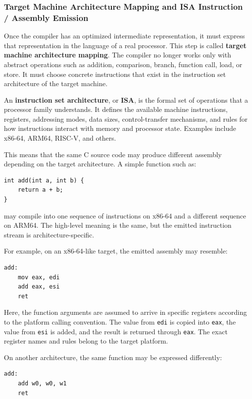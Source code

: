 \subsubsection{Target Machine Architecture Mapping and ISA Instruction / Assembly Emission}

Once the compiler has an optimized intermediate representation, it must express that representation in the language of a real processor. This step is called \textbf{target machine architecture mapping}. The compiler no longer works only with abstract operations such as addition, comparison, branch, function call, load, or store. It must choose concrete instructions that exist in the instruction set architecture of the target machine.

An \textbf{instruction set architecture}, or \textbf{ISA}, is the formal set of operations that a processor family understands. It defines the available machine instructions, registers, addressing modes, data sizes, control-transfer mechanisms, and rules for how instructions interact with memory and processor state. Examples include x86-64, ARM64, RISC-V, and others.

This means that the same C source code may produce different assembly depending on the target architecture. A simple function such as:

\begin{verbatim}
int add(int a, int b) {
    return a + b;
}
\end{verbatim}

may compile into one sequence of instructions on x86-64 and a different sequence on ARM64. The high-level meaning is the same, but the emitted instruction stream is architecture-specific.

For example, on an x86-64-like target, the emitted assembly may resemble:

\begin{verbatim}
add:
    mov eax, edi
    add eax, esi
    ret
\end{verbatim}

Here, the function arguments are assumed to arrive in specific registers according to the platform calling convention. The value from \texttt{edi} is copied into \texttt{eax}, the value from \texttt{esi} is added, and the result is returned through \texttt{eax}. The exact register names and rules belong to the target platform.

On another architecture, the same function may be expressed differently:

\begin{verbatim}
add:
    add w0, w0, w1
    ret
\end{verbatim}

